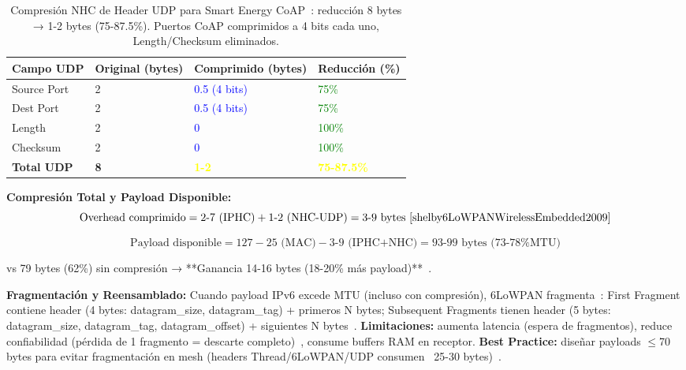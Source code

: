 \begin{table}[h]
\small
\centering
\caption{Compresión NHC de Header UDP para Smart Energy CoAP~\cite{shelby6LoWPANWirelessEmbedded2009}: reducción 8 bytes → 1-2 bytes (75-87.5\%). Puertos CoAP comprimidos a 4 bits cada uno, Length/Checksum eliminados.}
\label{tab:nhc-udp}
\begin{tabular}{p{3cm}p{2.5cm}p{2.8cm}p{2.2cm}}
\hline
\rowcolor{gray!20}
\textbf{Campo UDP} & \textbf{Original (bytes)} & \textbf{Comprimido (bytes)} & \textbf{Reducción (\%)} \\
\hline
Source Port & 2 & \textcolor{blue}{0.5 (4 bits)} & \textcolor{green}{75\%} \\
\hline
Dest Port & 2 & \textcolor{blue}{0.5 (4 bits)} & \textcolor{green}{75\%} \\
\hline
Length & 2 & \textcolor{blue}{0} & \textcolor{green}{100\%} \\
\hline
Checksum & 2 & \textcolor{blue}{0} & \textcolor{green}{100\%} \\
\hline
\textbf{Total UDP} & \textbf{8} & \textbf{\textcolor{yellow}{1-2}} & \textbf{\textcolor{yellow}{75-87.5\%}} \\
\hline
\end{tabular}
\end{table}

\textbf{Compresión Total y Payload Disponible:}
\begin{equation}
\text{Overhead comprimido} = 2\text{-}7 \text{ (IPHC)} + 1\text{-}2 \text{ (NHC-UDP)} = 3\text{-}9 \text{ bytes}~\cite{shelby6LoWPANWirelessEmbedded2009}
\end{equation}

\begin{equation}
\text{Payload disponible} = 127 - 25 \text{ (MAC)} - 3\text{-}9 \text{ (IPHC+NHC)} = 93\text{-}99 \text{ bytes (73-78\% MTU)}
\end{equation}

vs 79 bytes (62\%) sin compresión → **Ganancia 14-16 bytes (18-20\% más payload)**~\cite{shelby6LoWPANWirelessEmbedded2009}.

\textbf{Fragmentación y Reensamblado:} Cuando payload IPv6 excede MTU (incluso con compresión), 6LoWPAN fragmenta~\cite{shelby6LoWPANWirelessEmbedded2009}: First Fragment contiene header (4 bytes: datagram\_size, datagram\_tag) + primeros N bytes; Subsequent Fragments tienen header (5 bytes: datagram\_size, datagram\_tag, datagram\_offset) + siguientes N bytes~\cite{shelby6LoWPANWirelessEmbedded2009,abood6LoWPANTechnicalFeatures2024}. \textbf{Limitaciones:} aumenta latencia (espera de fragmentos), reduce confiabilidad (pérdida de 1 fragmento = descarte completo)~\cite{shelby6LoWPANWirelessEmbedded2009}, consume buffers RAM en receptor. \textbf{Best Practice:} diseñar payloads $\leq$70 bytes para evitar fragmentación en mesh (headers Thread/6LoWPAN/UDP consumen ~25-30 bytes)~\cite{shelby6LoWPANWirelessEmbedded2009}.

